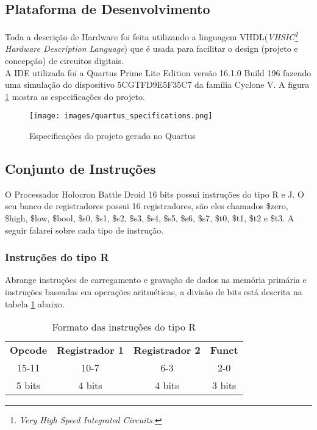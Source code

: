 \documentclass{article}
\newcommand\tab[1][0.50cm]{\hspace*{#1}}
\begin{document}
		\subsection{Plataforma de Desenvolvimento}
		\tab Toda a descri\c{c}\~{a}o de Hardware foi feita utilizando a linguagem VHDL(\textit{VHSIC\footnote{\textit{Very High Speed Integrated Circuits.}} Hardware Description Language}) que \'{e} usada para facilitar o design (projeto e concep\c{c}\~{a}o) de circuitos digitais.\\
		\tab A IDE utilizada foi a Quartus Prime Lite Edition vers\~{a}o 16.1.0 Build 196 fazendo uma simula\c{c}\~{a}o do dispositivo 5CGTFD9E5F35C7 da fam\'{i}lia Cyclone V. A figura \ref{fig:quartus_specifications} mostra as especifica\c{c}\~{o}es do projeto.
			\begin{figure}[H]
				\centering
				\caption[Especifica\c{c}\~{o}es do projeto]{Especifica\c{c}\~{o}es do projeto gerado no Quartus}
				\label{fig:quartus_specifications}
				\texttt{[image: images/quartus\_specifications.png]}
			\end{figure}
		\subsection{Conjunto de Instru\c{c}\~{o}es}
			\label{subsec:ConjuntoDeInstruções}
			\tab O Processador Holocron Battle Droid 16 bits possui instru\c{c}\~{o}es do tipo R e J. O seu banco de registradores possui 16 registradores, s\~{a}o eles chamados \$zero, \$high, \$low, \$bool, \$s0, \$s1, \$s2, \$s3, \$s4, \$s5, \$s6, \$s7, \$t0, \$t1, \$t2 e \$t3. A seguir falarei sobre cada tipo de instru\c{c}\~{a}o.
			\subsubsection{Instru\c{c}\~{o}es do tipo R}
				\tab Abrange instru\c{c}\~{o}es de carregamento e grava\c{c}\~{a}o de dados na mem\'{o}ria prim\'{a}ria e instru\c{c}\~{o}es baseadas em opera\c{c}\~{o}es aritm\'{e}ticas, a divis\~{a}o de bits est\'{a} descrita na tabela \ref{tab:R_type_instructions_format} abaixo.
				\begin{table}[H]
					\centering
					\caption[Instru\c{c}\~{o}es do tipo R]{Formato das instru\c{c}\~{o}es do tipo R}
					\label{tab:R_type_instructions_format}
					\begin{tabular}{c c c c}			
						\textbf{Opcode} & \textbf{Registrador 1} & \textbf{Registrador 2}  & \textbf{Funct} \\ 	
						15-11 & 10-7 & 6-3 & 2-0 \\
						5 bits & 4 bits & 4 bits & 3 bits\\
					\end{tabular}
				\end{table}
\end{document}
